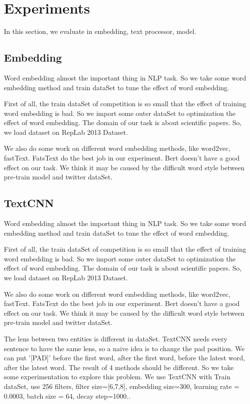 \section{Experiments}
\label{sec:experiments}

In this section, we evaluate in embedding, text processor, model.

\subsection{Embedding}
\label{sec:embedding}

Word embedding almost the important thing in NLP task. So we take some word embedding method and train dataSet to tune the effect of word embedding.

First of all, the train dataSet of competition is so small that the effect of training word embedding is bad. So we import some outer dataSet to optimization the effect of word embedding. The domain of our task is about scientific papers. So, we load dataset on RepLab 2013 Dataset. 

We also do some work on different word embedding methods, like word2vec, fastText. FatsText do the best job in our experiment. Bert doesn't have a good effect on our task. We think it may be caused by the difficult word style between pre-train model and twitter dataSet.

\subsection{TextCNN}
\label{sec:textCNN}




Word embedding almost the important thing in NLP task. So we take some word embedding method and train dataSet to tune the effect of word embedding.

First of all, the train dataSet of competition is so small that the effect of training word embedding is bad. So we import some outer dataSet to optimization the effect of word embedding. The domain of our task is about scientific papers. So, we load dataset on RepLab 2013 Dataset. 

We also do some work on different word embedding methods, like word2vec, fastText. FatsText do the best job in our experiment. Bert doesn't have a good effect on our task. We think it may be caused by the difficult word style between pre-train model and twitter dataSet.

The lens between two entities is different in dataSet. TextCNN needs every sentence to have the same lens, so a naive idea is to change the pad position.  We can put '[PAD]' before the first word, after the first word, before the latest word, after the latest word. The result of 4 methods should be different. So we take some experimentation to explore this problem. We use TextCNN with Train dataSet, use 256 filters, filter size=[6,7,8], embedding size=300, learning rate = 0.0003, batch size = 64, decay step=1000..

